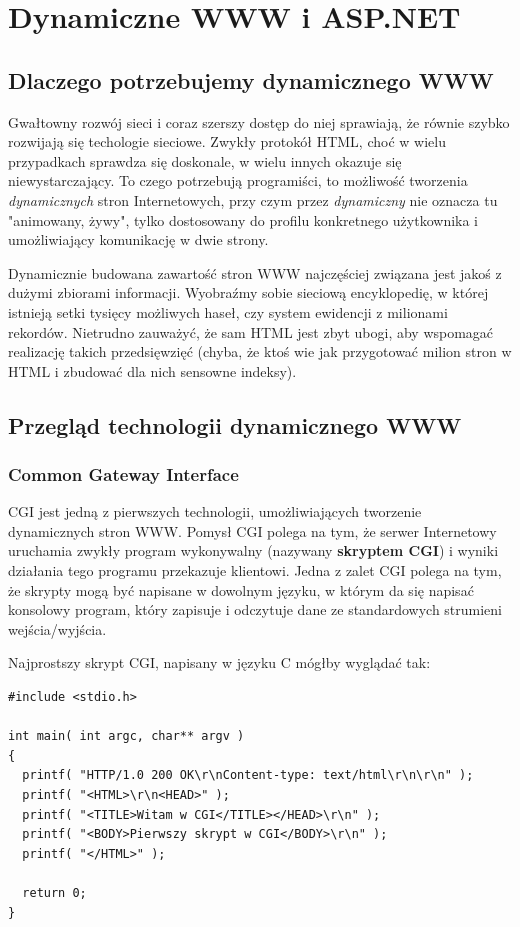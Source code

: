 ﻿\section{Dynamiczne WWW i ASP.NET}

\subsection{Dlaczego potrzebujemy dynamicznego WWW}

Gwałtowny rozwój sieci i coraz szerszy dostęp do niej sprawiają, że równie szybko rozwijają się techologie
sieciowe. Zwykły protokół HTML, choć w wielu przypadkach sprawdza się doskonale, w wielu innych okazuje się
niewystarczający. To czego potrzebują programiści, to możliwość tworzenia {\em dynamicznych} stron
Internetowych, przy czym przez {\em dynamiczny} nie oznacza tu "animowany, żywy", tylko dostosowany do
profilu konkretnego użytkownika i umożliwiający komunikację w dwie strony. 

Dynamicznie budowana zawartość stron WWW najczęściej związana jest jakoś z dużymi zbiorami informacji.
Wyobraźmy sobie sieciową encyklopedię, w której istnieją setki tysięcy
możliwych haseł, czy system ewidencji z milionami rekordów. Nietrudno zauważyć, że sam HTML jest zbyt
ubogi, aby wspomagać realizację takich przedsięwzięć (chyba, że ktoś wie jak przygotować milion stron 
w HTML i zbudować dla nich sensowne indeksy).

\subsection{Przegląd technologii dynamicznego WWW}

\subsubsection{Common Gateway Interface}

CGI jest jedną z pierwszych technologii, umożliwiających tworzenie dynamicznych stron WWW. 
Pomysł CGI polega na tym, że serwer Internetowy uruchamia zwykły program wykonywalny (nazywany
{\bf skryptem CGI}) i wyniki działania tego programu przekazuje klientowi. Jedna z zalet CGI
polega na tym, że skrypty mogą być napisane w dowolnym języku, w którym da się napisać konsolowy
program, który zapisuje i odczytuje dane ze standardowych strumieni wejścia/wyjścia.

Najprostszy skrypt CGI, napisany w języku C mógłby wyglądać tak:

\begin{scriptsize}
\begin{verbatim}
#include <stdio.h>

int main( int argc, char** argv )
{
  printf( "HTTP/1.0 200 OK\r\nContent-type: text/html\r\n\r\n" );
  printf( "<HTML>\r\n<HEAD>" );
  printf( "<TITLE>Witam w CGI</TITLE></HEAD>\r\n" );
  printf( "<BODY>Pierwszy skrypt w CGI</BODY>\r\n" );
  printf( "</HTML>" );

  return 0;
}
\end{verbatim}
\end{scriptsize}


